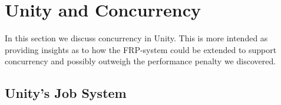 \section{Unity and Concurrency}
In this section we discuss concurrency in Unity. This is more intended as providing insights as to how the \gls{FRP}-system could be extended to support concurrency and possibly outweigh the performance penalty we discovered.

\subsection{Unity's Job System}
